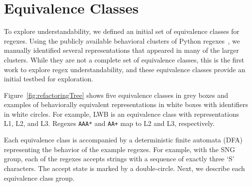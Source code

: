 \section{Equivalence Classes}
\label{sec:refactoring}
To explore understandability, we defined an initial set of equivalence classes for regexes.
Using the publicly available behavioral clusters of Python regexes~\cite{chapman2016}, we manually identified several representations that appeared in many of the larger clusters.
While they are not a complete set of equivalence classes, this is the first work to explore regex understandability, and these equivalence classes provide an initial testbed for exploration.

Figure~\ref{fig:refactoringTree} shows five equivalence classes in grey boxes and examples of behaviorally equivalent {representations} in white boxes with identifiers in white circles. For example, LWB is an equivalence class with representations L1, L2, and L3. Regexes \verb!AAA*! and \verb!AA+! map to L2 and L3, respectively.

Each equivalence class is accompanied by a deterministic finite automata (DFA) representing the behavior of the example regexes. For example, with the SNG group, each of the regexes accepts strings with a sequence of exactly three `S' characters. The accept state is marked by a double-circle.
Next, we describe each equivalence class group.

